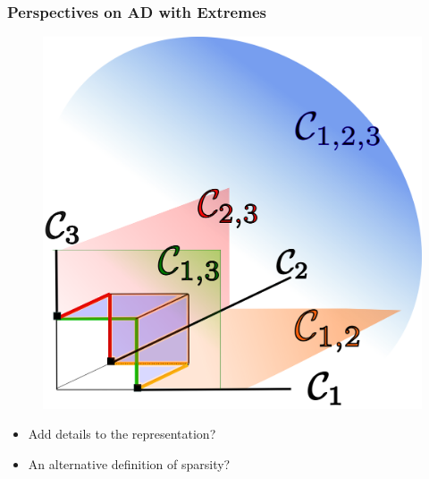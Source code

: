\documentclass[9pt]{beamer}
\begin{document}

\begin{frame}
\frametitle{Perspectives on AD with Extremes}

  \begin{figure}
    \centering
    \includegraphics[width=0.4\linewidth]{sourcefigs/cone}
  \end{figure}


  \begin{itemize}
\item Add details to the representation?
\item An alternative definition of sparsity?
  \end{itemize}
\end{frame}
\end{document}

